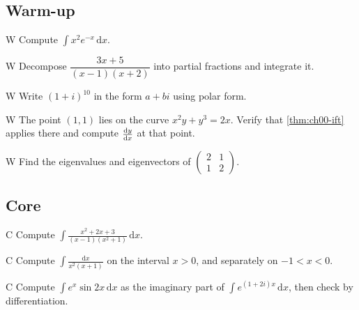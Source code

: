 \subsection*{Warm-up}

\begin{problem}{W}\label{prob:ch00-w1}
Compute $\displaystyle\int x^2e^{-x}\,\mathrm{d}x$.
\end{problem}

\begin{problem}{W}\label{prob:ch00-w2}
Decompose $\dfrac{3x+5}{(x-1)(x+2)}$ into partial fractions and integrate it.
\end{problem}

\begin{problem}{W}\label{prob:ch00-w3}
Write $(1+i)^{10}$ in the form $a + bi$ using polar form.
\end{problem}

\begin{problem}{W}\label{prob:ch00-w4}
The point $(1,1)$ lies on the curve $x^2y + y^3 = 2x$. Verify that
\cref{thm:ch00-ift} applies there and compute $\frac{\mathrm{d}y}{\mathrm{d}x}$ at that point.
\end{problem}

\begin{problem}{W}\label{prob:ch00-w5}
Find the eigenvalues and eigenvectors of
$\begin{pmatrix}2&1\\1&2\end{pmatrix}$.
\end{problem}

\subsection*{Core}

\begin{problem}{C}\label{prob:ch00-c1}
Compute $\displaystyle\int\frac{x^2 + 2x + 3}{(x-1)(x^2+1)}\,\mathrm{d}x$.
\end{problem}

\begin{problem}{C}\label{prob:ch00-c2}
Compute $\displaystyle\int\frac{\mathrm{d}x}{x^2(x+1)}$ on the interval
$x>0$, and separately on $-1<x<0$.
\end{problem}

\begin{problem}{C}\label{prob:ch00-c3}
Compute $\int e^{x}\sin 2x\,\mathrm{d}x$ as the imaginary part of
$\int e^{(1+2i)x}\,\mathrm{d}x$, then check by differentiation.
\end{problem}


